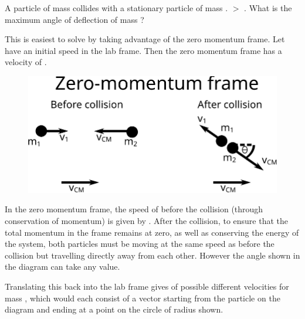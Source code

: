 
\begin{problem}   %
{A particle of mass  collides with a stationary particle of mass .  $>$ . What is the maximum angle of deflection of mass ?} 
{} 
{This is easiest to solve by taking advantage of the zero momentum frame. Let  have an initial speed  in the lab frame. Then the zero momentum frame has a velocity of .

\begin{figure}[h]
\centering
\includegraphics[width=1.0\textwidth]{../../../figures/dynamics_zero_momentum_frame_deflection.svg}
\caption{}\label{fig:dynamics_zero_momentum_frame_deflection}
\end{figure}


In the zero momentum frame, the speed of  before the collision (through conservation of momentum) is given by . After the collision, to ensure that the total momentum in the frame remains at zero, as well as conserving the energy of the system, both particles must be moving at the same speed as before the collision but travelling directly away from each other. However the angle \vari{\theta} shown in the diagram can take any value.


Translating this back into the lab frame gives of possible different velocities for mass  , which would each consist of a vector starting from the particle on the diagram and ending at a point on the circle of radius  shown.

}
\end{problem}
